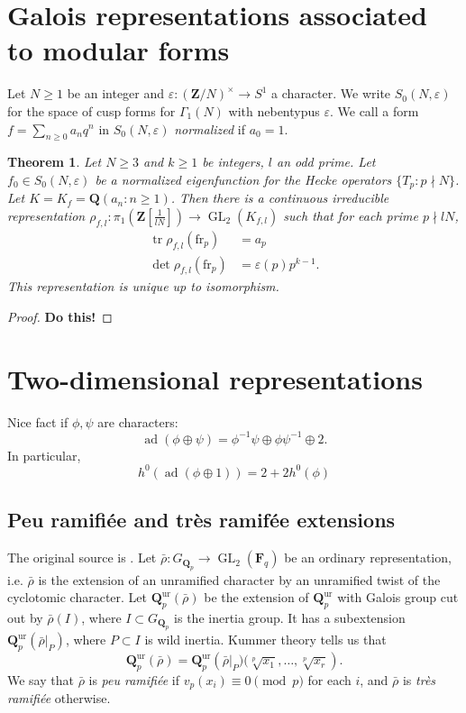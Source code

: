 \documentclass{amsart}
\DeclareMathOperator{\adjoint}{ad}
\DeclareMathOperator{\GL}{GL}
\DeclareMathOperator{\trace}{tr}
\newcommand{\dF}{\mathbf{F}}
\newcommand{\dQ}{\mathbf{Q}}
\newcommand{\dZ}{\mathbf{Z}}
\newcommand{\arithfrob}{\mathrm{fr}}
\newtheorem{theorem}[subsection]{Theorem}
\begin{document}
\section{Galois representations associated to modular forms}

Let $N\geqslant 1$ be an integer and $\varepsilon:(\dZ/N)^\times \to S^1$ a 
character. We write $S_0(N,\varepsilon)$ for the space of cusp forms for 
$\Gamma_1(N)$ with nebentypus $\varepsilon$. We call a form 
$f=\sum_{n\geqslant 0} a_n q^n$ in $S_0(N,\varepsilon)$ \emph{normalized} if 
$a_0=1$. 

\begin{theorem}
Let $N\geqslant 3$ and $k\geqslant 1$ be integers, $l$ an odd prime. Let 
$f_0\in S_0(N,\varepsilon)$ be a normalized eigenfunction for the Hecke 
operators $\{T_p:p\nmid N\}$. Let $K=K_f=\dQ(a_n:n\geqslant 1)$. 
Then there is a continuous irreducible representation 
$\rho_{f,l}:\pi_1\left(\dZ[\frac{1}{l N}]\right)\to \GL_2(K_{f,l})$ such that 
for each prime $p\nmid l N$, 
\begin{align*}
  \trace \rho_{f,l}(\arithfrob_p) &= a_p \\
  \det \rho_{f,l}(\arithfrob_p) &= \varepsilon(p) p^{k-1} .
\end{align*}
This representation is unique up to isomorphism. 
\end{theorem}
\begin{proof}
\textbf{Do this!}
\end{proof}





\section{Two-dimensional representations}

Nice fact if $\phi,\psi$ are characters: 
\[
  \adjoint(\phi\oplus \psi) = \phi^{-1}\psi\oplus \phi\psi^{-1}\oplus 2 .
\]
In particular, 
\[
  h^0(\adjoint(\phi\oplus 1)) = 2+2 h^0(\phi)
\]


\subsection{Peu ramifi\'ee and tr\`es ramif\'ee extensions}

The original source is \cite[2.4.6]{serre-1987}. 
Let $\bar\rho:G_{\dQ_p}\to \GL_2(\dF_q)$ be 
an ordinary representation, i.e. $\bar\rho$ is the extension of an unramified 
character by an unramified twist of the cyclotomic character. Let 
$\dQ_p^\mathrm{ur}(\bar\rho)$ be the extension of $\dQ_p^\mathrm{ur}$ with 
Galois group cut out by $\bar\rho(I)$, where $I\subset G_{\dQ_p}$ is the 
inertia group. It has a subextension $\dQ_p^\mathrm{ur}(\bar\rho|_P)$, where 
$P\subset I$ is wild inertia. Kummer theory tells us that 
\[
  \dQ_p^\mathrm{ur}(\bar\rho) = \dQ_p^\mathrm{ur}\left(\bar\rho|_P)(\sqrt[p]{x_1},\dots,\sqrt[p]{x_r}\right).
\]
We say that $\bar\rho$ is \emph{peu ramifi\'ee} if $v_p(x_i)\equiv 0\pmod p$ 
for each $i$, and $\bar\rho$ is \emph{tr\`es ramifi\'ee} otherwise. 
\end{document}
